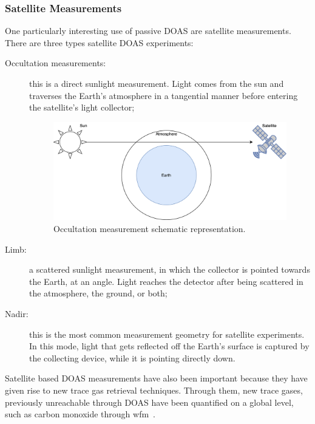 \subsubsection{Satellite Measurements}%
\label{ssub:satellite_measurements}

One particularly interesting use of passive \gls{DOAS} are satellite
measurements. There are three types satellite \gls{DOAS} experiments:
\begin{description}
    \item[Occultation measurements:] this is a direct sunlight
        measurement. Light comes from the sun and traverses the Earth's
        atmosphere in a tangential manner before entering the
        satellite's light collector;

        \begin{figure}[htpb]
            \centering
            \includegraphics[width=0.8\linewidth]{img/png/occultation.png}
            \caption{Occultation measurement schematic representation.}
            \label{fig:occultation}
        \end{figure}

    \item[Limb:] a scattered sunlight measurement, in which the
        collector is pointed towards the Earth, at an angle. Light
        reaches the detector after being scattered in the atmosphere,
        the ground, or both;
    \item[Nadir:] this is the most common measurement geometry for
        satellite experiments. In this mode, light that gets reflected
        off the Earth's surface is captured by the collecting device,
        while it is pointing directly down.
\end{description}

Satellite based \gls{DOAS} measurements have also been important because
they have given rise to new trace gas retrieval techniques. Through
them, new trace gases, previously unreachable through \gls{DOAS} have
been quantified on a global level, such as carbon monoxide through
\gls{wfm}~\cite{Buchwitz2000, Buchwitz2004}.

